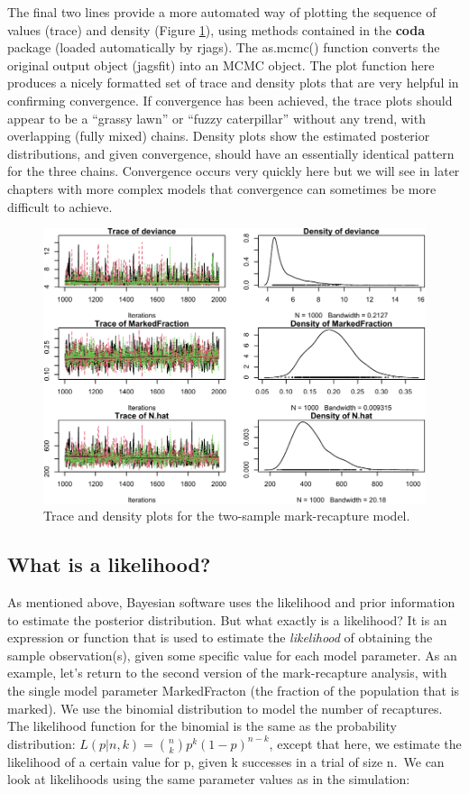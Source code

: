 \documentclass[
]{krantz}
\begin{document}
The final two lines provide a more automated way of plotting the sequence of values (trace) and density (Figure \ref{fig:TracePlots}), using methods contained in the \textbf{coda} \citep{R-coda} package (loaded automatically by rjags). The as.mcmc() function converts the original output object (jagsfit) into an MCMC object. The plot function here produces a nicely formatted set of trace and density plots that are very helpful in confirming convergence. If convergence has been achieved, the trace plots should appear to be a ``grassy lawn'' or ``fuzzy caterpillar'' without any trend, with overlapping (fully mixed) chains. Density plots show the estimated posterior distributions, and given convergence, should have an essentially identical pattern for the three chains. Convergence occurs very quickly here but we will see in later chapters with more complex models that convergence can sometimes be more difficult to achieve.

\begin{figure}
\includegraphics[width=0.9\linewidth]{bookdown_files/figure-latex/TracePlots-1} \caption{Trace and density plots for the two-sample mark-recapture model.}\label{fig:TracePlots}
\end{figure}

\hypertarget{Likelihood}{%
\subsection{What is a likelihood?}\label{Likelihood}}

As mentioned above, Bayesian software uses the likelihood and prior information to estimate the posterior distribution. But what exactly is a likelihood? It is an expression or function that is used to estimate the \emph{likelihood} of obtaining the sample observation(s), given some specific value for each model parameter. As an example, let's return to the second version of the mark-recapture analysis, with the single model parameter MarkedFracton (the fraction of the population that is marked). We use the binomial distribution to model the number of recaptures. The likelihood function for the binomial is the same as the probability distribution: \(L(p | n, k) = {n \choose k} p^{k} (1-p)^{n-k}\), except that here, we estimate the likelihood of a certain value for p, given k successes in a trial of size n.~We can look at likelihoods using the same parameter values as in the simulation:
\end{document}
